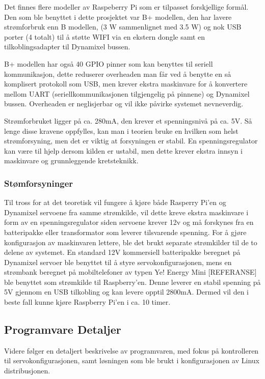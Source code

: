 \documentclass[12pt]{report}
\begin{document}
Det finnes flere modeller av Raspeberry Pi som er tilpasset forskjellige formål. Den som ble benyttet i dette prosjektet var B+ modellen, den har lavere strømforbruk enn B modellen, (3 W sammenlignet med 3.5 W) og nok USB porter (4 totalt) til å støtte WIFI via en ekstern dongle samt en tilkoblingsadapter til Dynamixel bussen. 

B+ modellen har også 40 GPIO pinner som kan benyttes til seriell kommunikasjon, dette reduserer overheaden man får ved å benytte en så komplisert protokoll som USB, men krever ekstra maskinvare for å konvertere mellom UART (seriellkommunikasjonen tilgjengelig på pinnene) og Dynamixel bussen. Overheaden er neglisjerbar og vil ikke påvirke systemet nevneverdig.

Strømforbruket ligger på ca. 280mA, den krever et spenningsnivå på ca. 5V. Så lenge disse kravene oppfylles, kan man i teorien bruke en hvilken som helst strømforsyning, men det er viktig at forsyningen er stabil. En spenningsregulator kan være til hjelp dersom kilden er ustabil, men dette krever ekstra innsyn i maskinvare og grunnleggende kretsteknikk.

\subsubsection{Stømforsyninger}
Til tross for at det teoretisk vil fungere å kjøre både Rasperry Pi’en og Dynamixel servoene fra samme strømkilde, vil dette kreve ekstra maskinvare i form av en spenningsregulator siden servoene krever 12v og må forskynes fra en batteripakke eller transformator som leverer tilsvarende spenning. For å gjøre konfigurasjon av maskinvaren lettere, ble det brukt separate strømkilder til de to delene av systemet. En standard 12V kommersiell batteripakke beregnet på Dynamixel servoer ble benyttet til å styre servokonfigurasjonen, mens en strømbank beregnet på mobiltelefoner av typen Ye! Energy Mini [REFERANSE] ble benyttet som strømkilde til Raspberry’en. Denne leverer en stabil spenning på 5V gjennom en USB tilkobling og kan levere opptil 2800mA. Dermed vil den i beste fall kunne kjøre Raspberry Pi’en i ca. 10 timer.

\subsection{Programvare Detaljer}
Videre følger en detaljert beskrivelse av programvaren, med fokus på kontrolleren til servokonfigurasjonen, samt løsningen som ble brukt i konfigurasjonen av Linux distribusjonen.
\end{document}
